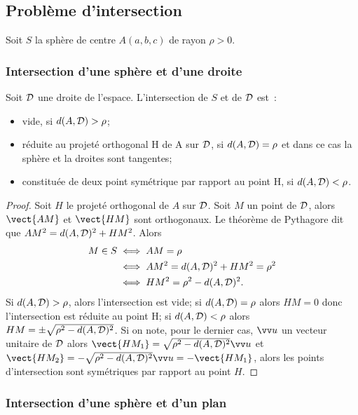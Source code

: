 \subsection{Problème d'intersection}
Soit $S$ la sphère de centre $A(a,b,c)$ de rayon $\rho>0$.

\subsubsection{Intersection d'une sphère et d'une droite}

\begin{prop}
  Soit $\mathcal{D}$ une droite de l'espace. L'intersection de $S$ et de $\mathcal{D}$ est~:
  \begin{itemize}
  \item vide, si $d(A,\mathcal{D})>\rho$;
  \item réduite au projeté orthogonal H de A sur $\mathcal{D}$, si $d(A,\mathcal{D})=\rho$ et dans ce cas la sphère et la droites sont tangentes;
  \item constituée de deux point symétrique par rapport au point H, si $d(A,\mathcal{D})<\rho$.
  \end{itemize}
\end{prop}

\begin{proof}
  Soit $H$ le projeté orthogonal de $A$ sur $\mathcal{D}$. Soit $M$ un point de $\mathcal{D}$, alors $\vect{AM}$ et $\vect{HM}$ sont orthogonaux. Le théorème de Pythagore dit que $AM^2=d(A,\mathcal{D})^2+HM^2$. Alors
  \begin{align}
    M \in S &\iff AM=\rho\\
    &\iff AM^2=d(A,\mathcal{D})^2+HM^2=\rho^2\\
    &\iff HM^2=\rho^2-d(A,\mathcal{D})^2.
  \end{align}
Si $d(A,\mathcal{D})>\rho$, alors l'intersection est vide; si $d(A,\mathcal{D})=\rho$ alors $HM=0$ donc l'intersection est réduite au point H; si $d(A,\mathcal{D})<\rho$ alors $HM=\pm\sqrt{\rho^2-d(A,\mathcal{D})^2}$. Si on note, pour le dernier cas, $\vu$ un vecteur unitaire de $\mathcal{D}$ alors $\vect{HM_1}=\sqrt{\rho^2-d(A,\Dr)^2}\vu$ et $\vect{HM_2}=-\sqrt{\rho^2-d(A,\Dr)^2}\vu=-\vect{HM_1}$, alors les points d'intersection sont symétriques par rapport au point $H$.
\end{proof}

\subsubsection{Intersection d'une sphère et d'un plan}

